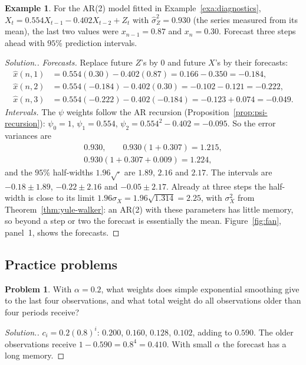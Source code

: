 \documentclass[11pt,a4paper]{article}
\theoremstyle{definition}
\newtheorem{exa}[thm]{Example}
\newtheorem{problemx}{Problem}[subsection]
\newenvironment{problem}{\begin{problemx}}{\end{problemx}}
\newenvironment{solution}
  {\renewcommand{\qedsymbol}{}\begin{proof}[\textit{Solution}.]}
  {\end{proof}}
\begin{document}
\begin{exa}\label{exa:ar2-forecast}
For the AR(2) model fitted in Example~\ref{exa:diagnostics}, $X_t = 0.554X_{t-1} - 0.402X_{t-2} + Z_t$ with $\hat\sigma_Z^2 = 0.930$ (the series measured from its
mean), the last two values were $x_{n-1} = 0.87$ and $x_n = 0.30$. Forecast three steps ahead with $95\%$ prediction intervals.
\end{exa}

\begin{solution}
\emph{Forecasts.} Replace future $Z$'s by $0$ and future $X$'s by their forecasts:
\begin{align*}
\hat x(n, 1) &= 0.554(0.30) - 0.402(0.87) = 0.166 - 0.350 = -0.184 , \\
\hat x(n, 2) &= 0.554(-0.184) - 0.402(0.30) = -0.102 - 0.121 = -0.222 , \\
\hat x(n, 3) &= 0.554(-0.222) - 0.402(-0.184) = -0.123 + 0.074 = -0.049 .
\end{align*}
\emph{Intervals.} The $\psi$ weights follow the AR recursion (Proposition~\ref{prop:psi-recursion}): $\psi_0 = 1$, $\psi_1 = 0.554$, $\psi_2 = 0.554^2 - 0.402 = -0.095$. So
the error variances are
\begin{gather*}
0.930 , \qquad 0.930(1 + 0.307) = 1.215 , \\
0.930(1 + 0.307 + 0.009) = 1.224 ,
\end{gather*}
and the $95\%$ half-widths $1.96\sqrt{\cdot}$ are $1.89$, $2.16$ and $2.17$. The intervals are $-0.18 \pm 1.89$, $-0.22 \pm 2.16$ and $-0.05 \pm 2.17$. Already at three
steps the half-width is close to its limit $1.96\sigma_X = 1.96\sqrt{1.314} = 2.25$, with $\sigma_X^2$ from Theorem~\ref{thm:yule-walker}: an AR(2) with these
parameters has little memory, so beyond a step or two the forecast is essentially the mean. Figure~\ref{fig:fan},
panel~1, shows the forecasts.
\end{solution}

\subsection{Practice problems}
\begin{problem}\label{prob:ses-weights}
With $\alpha = 0.2$, what weights does simple exponential smoothing give to the last four observations, and what total
weight do all observations older than four periods receive?
\end{problem}

\begin{solution}
$c_i = 0.2(0.8)^i$: $0.200$, $0.160$, $0.128$, $0.102$, adding to $0.590$. The older observations receive $1 - 0.590 = 0.8^4 = 0.410$. With small $\alpha$
the forecast has a long memory.
\end{solution}
\end{document}
